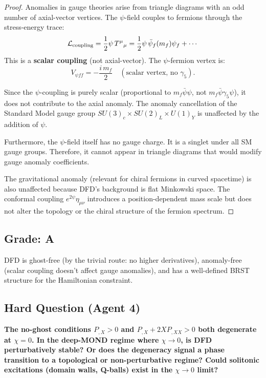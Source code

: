 \documentclass[11pt,a4paper]{article}
\begin{document}
\begin{proof}
Anomalies in gauge theories arise from triangle diagrams with an odd number of axial-vector vertices. The $\psi$-field couples to fermions through the stress-energy trace:
\begin{equation}
\mathcal{L}_{\rm coupling} = \frac{1}{2}\psi\,T^\mu{}_\mu = \frac{1}{2}\psi\,\bar\psi_f(m_f)\psi_f + \cdots
\end{equation}
This is a \textbf{scalar coupling} (not axial-vector). The $\psi$-fermion vertex is:
\begin{equation}
V_{\psi ff} = -\frac{i\,m_f}{2}\quad (\text{scalar vertex, no $\gamma_5$}).
\end{equation}

Since the $\psi$-coupling is purely scalar (proportional to $m_f \bar\psi\psi$, not $m_f\bar\psi\gamma_5\psi$), it does not contribute to the axial anomaly. The anomaly cancellation of the Standard Model gauge group $SU(3)_c \times SU(2)_L \times U(1)_Y$ is unaffected by the addition of $\psi$.

Furthermore, the $\psi$-field itself has no gauge charge. It is a singlet under all SM gauge groups. Therefore, it cannot appear in triangle diagrams that would modify gauge anomaly coefficients.

The gravitational anomaly (relevant for chiral fermions in curved spacetime) is also unaffected because DFD's background is flat Minkowski space. The conformal coupling $e^{2\psi}\eta_{\mu\nu}$ introduces a position-dependent mass scale but does not alter the topology or the chiral structure of the fermion spectrum.
\end{proof}

\subsection{Grade: A}

DFD is ghost-free (by the trivial route: no higher derivatives), anomaly-free (scalar coupling doesn't affect gauge anomalies), and has a well-defined BRST structure for the Hamiltonian constraint.

\subsection{Hard Question (Agent 4)}

\textbf{The no-ghost conditions $P_{,X} > 0$ and $P_{,X} + 2XP_{,XX} > 0$ both degenerate at $\chi = 0$. In the deep-MOND regime where $\chi \to 0$, is DFD perturbatively stable? Or does the degeneracy signal a phase transition to a topological or non-perturbative regime? Could solitonic excitations (domain walls, Q-balls) exist in the $\chi \to 0$ limit?}
\end{document}
